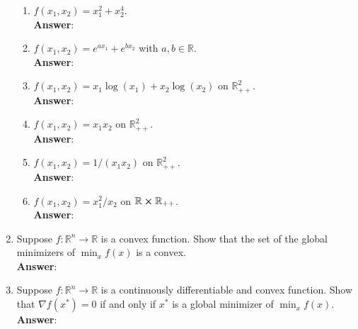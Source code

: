 \documentclass{article}
\begin{document}
\begin{enumerate}
            \begin{enumerate}
                  \item $f(x_1,x_2)=x_1^2+x_2^4$.\\
                        \textbf{Answer}:
                  \item $f(x_1,x_2)=e^{ax_1}+e^{bx_2}$ with $a,b\in\mathbb{R}$.\\
                        \textbf{Answer}:
                  \item $f(x_1,x_2)=x_1\log(x_1)+x_2\log(x_2)$ on $\mathbb{R}_{++}^2$.\\
                        \textbf{Answer}:
                  \item $f(x_1,x_2)=x_1x_2$ on $\mathbb{R}_{++}^2$.\\
                        \textbf{Answer}:
                  \item $f(x_1,x_2)=1/(x_1x_2)$ on $\mathbb{R}_{++}^2$.\\
                        \textbf{Answer}:
                  \item $f(x_1,x_2)=x_1^2/x_2$ on $\mathbb{R}\cross\mathbb{R}_{++}$.\\
                        \textbf{Answer}:
            \end{enumerate}
      \item Suppose $f:\mathbb{R}^n\rightarrow\mathbb{R}$ is a convex function. Show that the set of the global  minimizers of $\min_xf(x)$ is a convex.\\
            \textbf{Answer}:
      \item Suppose $f:\mathbb{R}^n\rightarrow\mathbb{R}$ is a continuously differentiable and convex function. Show that $\nabla f(x^*)=0$ if and only if $x^*$ is a global minimizer of $\min_xf(x)$.\\
            \textbf{Answer}:
\end{enumerate}
\end{document}
